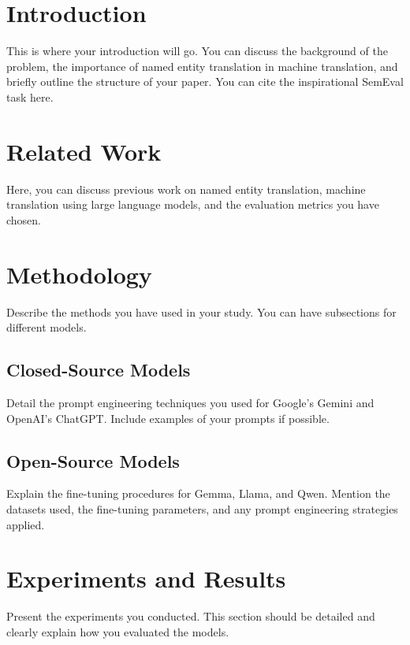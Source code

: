 \documentclass{ecai}
\begin{document}
\section{Introduction}
\label{sec:intro}
This is where your introduction will go. You can discuss the background of the problem, the importance of named entity translation in machine translation, and briefly outline the structure of your paper. You can cite the inspirational SemEval task here.


\section{Related Work}
\label{sec:related}
Here, you can discuss previous work on named entity translation, machine translation using large language models, and the evaluation metrics you have chosen.

\section{Methodology}
\label{sec:methodology}
Describe the methods you have used in your study. You can have subsections for different models.

\subsection{Closed-Source Models}
Detail the prompt engineering techniques you used for Google's Gemini and OpenAI's ChatGPT. Include examples of your prompts if possible.

\subsection{Open-Source Models}
Explain the fine-tuning procedures for Gemma, Llama, and Qwen. Mention the datasets used, the fine-tuning parameters, and any prompt engineering strategies applied.

\section{Experiments and Results}
\label{sec:experiments}
Present the experiments you conducted. This section should be detailed and clearly explain how you evaluated the models.
\end{document}
